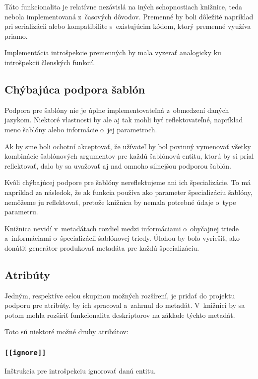 Táto funkcionalita je relatívne nezávislá na iných schopnostiach knižnice, teda nebola implementovaná z~časových dôvodov. Premenné by boli dôležité napríklad pri serializácii alebo kompatibilite s~existujúcim kódom, ktorý premenné využíva priamo.

Implementácia introšpekcie premenných by mala vyzerať analogicky ku introšpekcii členských funkcií.

\subsection{Chýbajúca podpora šablón}

Podpora pre šablóny nie je úplne implementovateľná z~obmedzení daných jazykom. Niektoré vlastnosti by ale aj tak mohli byť reflektovateľné, napríklad meno šablóny alebo informácie o~jej parametroch.

Ak by sme boli ochotní akceptovať, že užívateľ by bol povinný vymenovať všetky kombinácie šablónových argumentov pre každú šablónovú entitu, ktorú by si prial reflektovať, dalo by sa uvažovať aj nad omnoho silnejšou podporou šablón.

Kvôli chýbajúcej podpore pre šablóny nereflektujeme ani ich špecializácie. To má napríklad za následok, že ak funkcia používa ako parameter špecializáciu šablóny, nemôžeme ju reflektovať, pretože knižnica by nemala potrebné údaje o~type parametru.

Knižnica nevidí v~metadátach rozdiel medzi informáciami o~obyčajnej triede a~informáciami o~špecializácii šablónovej triedy. Úlohou by bolo vyriešiť, ako donútiť generátor produkovať metadáta pre každú špecializáciu. 

\subsection{Atribúty}

Jedným, respektíve celou skupinou možných rozšírení, je pridať do projektu podporu pre atribúty. \PPreflector{} by ich spracoval a~zahrnul do metadát. V~knižnici by sa potom mohla rozšíriť funkcionalita deskriptorov na základe týchto metadát.

Toto sú niektoré možné druhy atribútov:

\subsubsection{\texttt{[[ignore]]}}

Inštrukcia pre introšpekciu ignorovať danú entitu.

